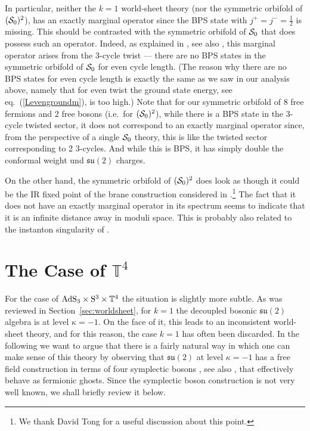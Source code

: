 \documentclass[12pt,a4paper]{article}
\begin{document}
In particular, neither the $k=1$ world-sheet theory (nor the symmetric orbifold of $({\cal S}_0)^2$), has an exactly marginal operator since the BPS state with $j^+=j^-=\frac{1}{2}$ is missing.  This should be contrasted with the symmetric orbifold of ${\cal S}_0$ that does possess such an operator. Indeed, as explained in  \cite{Eberhardt:2017pty}, see also \cite{Gukov:2004ym}, this marginal operator arises from the $3$-cycle twist ---  there are no BPS states in the symmetric orbifold of ${\cal S}_0$ for even cycle length. (The reason why there are no BPS states for even cycle length is exactly the same as we saw in our analysis above, namely that for even twist the ground state energy, see eq.~(\ref{Levengroundm}), is too high.) Note that for our symmetric orbifold of $8$ free fermions and $2$ free bosons (i.e.\ for $({\cal S}_0)^2$), while there is a BPS state in the 3-cycle twisted sector, it does not correspond to an exactly marginal operator since, from the perspective of a single ${\cal S}_0$ theory, this is like the twisted sector corresponding to 2 $3$-cycles. And while this is BPS, it has simply double the conformal weight und $\mathfrak{su}(2)$ charges. 

On the other hand, the symmetric orbifold of $({\cal S}_0)^2$ does look as though it could be the IR fixed point of the brane construction considered in \cite{Tong:2014yna}.\footnote{We thank David Tong for a useful discussion about this point.} The fact that it does not have an exactly marginal operator in its spectrum seems to indicate that it is an infinite distance away in moduli space. This is probably also related to the  instanton singularity of \cite{Seiberg:1999xz}. 




\section{The Case of $\mathbb{T}^4$}\label{sec:symorbT4}

For the case of ${\rm AdS}_3\times {\rm S}^3 \times \mathbb{T}^4$ the situation is slightly more subtle. As was reviewed in Section~\ref{sec:worldsheet}, for $k=1$ the decoupled bosonic $\mathfrak{su}(2)$ algebra is at level $\kappa=-1$. On the face of it, this leads to an inconsistent world-sheet theory, and for this reason, the case $k=1$ has often been discarded. In the following we want to argue that there is a fairly natural way in which one can make sense of this theory by observing that $\mathfrak{su}(2)$  at level $\kappa=-1$ has a free field construction in terms of four symplectic bosons \cite{Goddard:1987td}, see also \cite[eq.~(3.19)]{Beem:2014rza},  that effectively behave as fermionic ghosts.  Since the symplectic boson construction is not very well known, we shall briefly review it below. 
\end{document}
